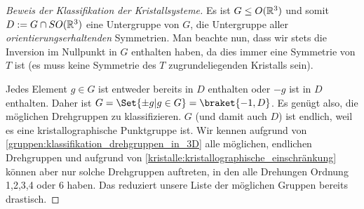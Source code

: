 \begin{proof}[Beweis der Klassifikation der Kristallsysteme]
Es ist $G\leq O(\mathbb{R}^3)$ und somit $D:=G\cap SO(\mathbb{R}^3)$ eine Untergruppe von $G$, die Untergruppe aller \emph{orientierungserhaltenden} Symmetrien. Man beachte nun, dass wir stets die Inversion im Nullpunkt in $G$ enthalten haben, da dies immer eine Symmetrie von $T$ ist (es muss keine Symmetrie des $T$ zugrundeliegenden Kristalls sein).

Jedes Element $g\in G$ ist entweder bereits in $D$ enthalten oder $-g$ ist in $D$ enthalten. Daher ist $G=\Set{\pm g | g\in G} = \braket{-1,D}$. Es genügt also, die möglichen Drehgruppen zu klassifizieren. $G$ (und damit auch $D$) ist endlich, weil es eine kristallographische Punktgruppe ist. Wir kennen aufgrund von \ref{gruppen:klassifikation_drehgruppen_in_3D} alle möglichen, endlichen Drehgruppen und aufgrund von \ref{kristalle:kristallographische_einschränkung} können aber nur solche Drehgruppen auftreten, in den alle Drehungen Ordnung 1,2,3,4 oder 6 haben. Das reduziert unsere Liste der möglichen Gruppen bereits drastisch.
\end{proof}